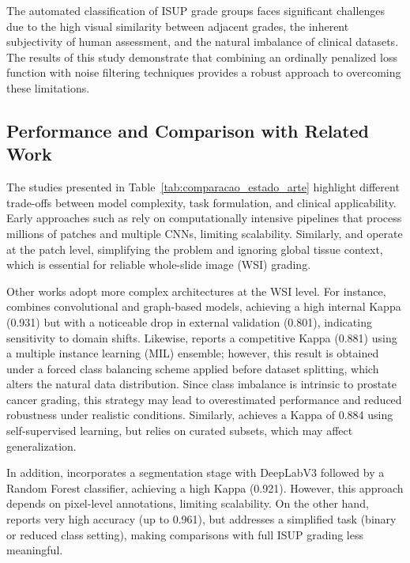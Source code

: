 The automated classification of ISUP grade groups faces significant challenges due to the high visual similarity between adjacent grades, the inherent subjectivity of human assessment, and the natural imbalance of clinical datasets. The results of this study demonstrate that combining an ordinally penalized loss function with noise filtering techniques provides a robust approach to overcoming these limitations.

\subsection{Performance and Comparison with Related Work}

The studies presented in Table~\ref{tab:comparacao_estado_arte} highlight different trade-offs between model complexity, task formulation, and clinical applicability. Early approaches such as \cite{pyramidalcnn} rely on computationally intensive pipelines that process millions of patches and multiple CNNs, limiting scalability. Similarly, \cite{ikromjanov2021vit_prostate} and \cite{kosoko2024xai_prostate} operate at the patch level, simplifying the problem and ignoring global tissue context, which is essential for reliable whole-slide image (WSI) grading.

Other works adopt more complex architectures at the WSI level. For instance, \cite{Xiang2023Prostate} combines convolutional and graph-based models, achieving a high internal Kappa (0.931) but with a noticeable drop in external validation (0.801), indicating sensitivity to domain shifts. Likewise, \cite{bhattacharyya2024wsi} reports a competitive Kappa (0.881) using a multiple instance learning (MIL) ensemble; however, this result is obtained under a forced class balancing scheme applied before dataset splitting, which alters the natural data distribution. Since class imbalance is intrinsic to prostate cancer grading, this strategy may lead to overestimated performance and reduced robustness under realistic conditions. Similarly, \cite{bhattacharyya2026tsor} achieves a Kappa of 0.884 using self-supervised learning, but relies on curated subsets, which may affect generalization.

In addition, \cite{kabir2025automating} incorporates a segmentation stage with DeepLabV3 followed by a Random Forest classifier, achieving a high Kappa (0.921). However, this approach depends on pixel-level annotations, limiting scalability. On the other hand, \cite{alici2024efficient} reports very high accuracy (up to 0.961), but addresses a simplified task (binary or reduced class setting), making comparisons with full ISUP grading less meaningful.

